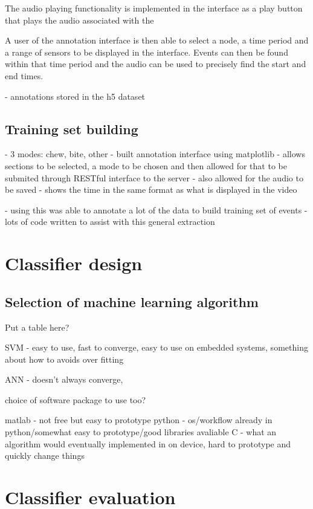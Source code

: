 The audio playing functionality is implemented in the interface as a play button that plays the audio associated with the 

A user of the annotation interface is then able to select a node, a time period and a range of sensors to be displayed in the interface. Events can then be found within that time period and the audio can be used to precisely find the start and end times. 



- annotations stored in the h5 dataset


\subsection{Training set building}

- 3 modes: chew, bite, other
- built annotation interface using matplotlib
	- allows sections to be selected, a mode to be chosen and then allowed for that to be submited through RESTful interface to the server
- also allowed for the audio to be saved
- shows the time in the same format as what is displayed in the video

- using this was able to annotate a lot of the data to build training set of events
- lots of code written to assist with this general extraction

\section{Classifier design}

\subsection{Selection of machine learning algorithm}

Put a table here?

SVM - easy to use, fast to converge, easy to use on embedded systems, something about how to avoids over fitting

ANN - doesn't always converge, 


choice of software package to use too?

matlab - not free but easy to prototype
python - os/workflow already in python/somewhat easy to prototype/good libraries avaliable
C - what an algorithm would eventually implemented in on device, hard to prototype and quickly change things


\section{Classifier evaluation}
